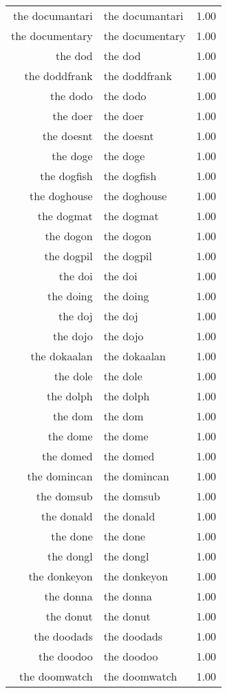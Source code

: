 \begin{table}[ht]
\begin{tabular}{rlr}
  the documantari & the documantari & 1.00 \\ 
  the documentary & the documentary & 1.00 \\ 
  the dod & the dod & 1.00 \\ 
  the doddfrank & the doddfrank & 1.00 \\ 
  the dodo & the dodo & 1.00 \\ 
  the doer & the doer & 1.00 \\ 
  the doesnt & the doesnt & 1.00 \\ 
  the doge & the doge & 1.00 \\ 
  the dogfish & the dogfish & 1.00 \\ 
  the doghouse & the doghouse & 1.00 \\ 
  the dogmat & the dogmat & 1.00 \\ 
  the dogon & the dogon & 1.00 \\ 
  the dogpil & the dogpil & 1.00 \\ 
  the doi & the doi & 1.00 \\ 
  the doing & the doing & 1.00 \\ 
  the doj & the doj & 1.00 \\ 
  the dojo & the dojo & 1.00 \\ 
  the dokaalan & the dokaalan & 1.00 \\ 
  the dole & the dole & 1.00 \\ 
  the dolph & the dolph & 1.00 \\ 
  the dom & the dom & 1.00 \\ 
  the dome & the dome & 1.00 \\ 
  the domed & the domed & 1.00 \\ 
  the domincan & the domincan & 1.00 \\ 
  the domsub & the domsub & 1.00 \\ 
  the donald & the donald & 1.00 \\ 
  the done & the done & 1.00 \\ 
  the dongl & the dongl & 1.00 \\ 
  the donkeyon & the donkeyon & 1.00 \\ 
  the donna & the donna & 1.00 \\ 
  the donut & the donut & 1.00 \\ 
  the doodads & the doodads & 1.00 \\ 
  the doodoo & the doodoo & 1.00 \\ 
  the doomwatch & the doomwatch & 1.00 \\ 

\end{tabular}
\end{table}
